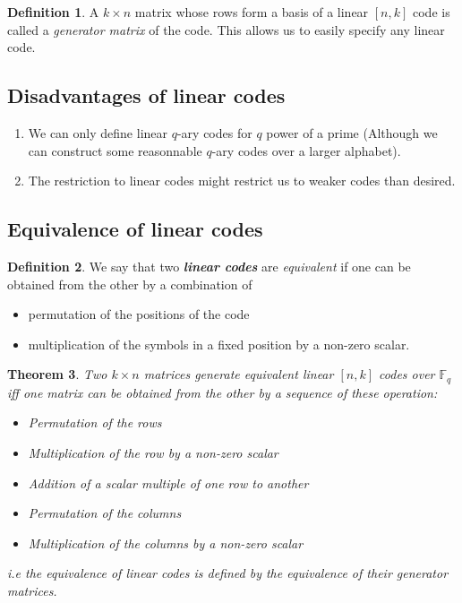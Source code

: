 \documentclass[11pt,a4paper]{article}
\theoremstyle{definition}
\newtheorem{definition}{Definition}[section]
\theoremstyle{plain}
\newtheorem{theorem}[definition]{Theorem}
\theoremstyle{remark}
\begin{document}
\begin{definition}
    A $k \times n$ matrix whose rows form a basis of a linear $[n,k]$ code is called a \emph{generator matrix} of the code.
    This allows us to easily specify any linear code. 
\end{definition}

\subsection{Disadvantages of linear codes}

\begin{enumerate}[label = \roman*)]
    \item We can only define linear $q$-ary codes for $q$ power of a prime (Although we can construct some reasonnable $q$-ary codes over a larger alphabet). 
    \item The restriction to linear codes might restrict us to weaker codes than desired. 
\end{enumerate}

\subsection{Equivalence of linear codes}

\begin{definition}
    We say that two \textbf{\emph{linear codes}} are \emph{equivalent} if one can be obtained from the other by a combination of 
    \begin{itemize}
        \item permutation of the positions of the code 
        \item multiplication of the symbols in a fixed position by a non-zero scalar. 
    \end{itemize}
\end{definition}

\begin{theorem}
    Two $k \times n$ matrices generate equivalent linear $[n,k]$ codes over $\mathbb{F}_q$ iff one matrix 
    can be obtained from the other by a sequence of these operation: 
    \begin{itemize}
        \item[R1. ] Permutation of the rows 
        \item[R2. ] Multiplication of the row by a non-zero scalar 
        \item[R3. ] Addition of a scalar multiple of one row to another 
        \item[C1. ] Permutation of the columns 
        \item[C2. ] Multiplication of the columns by a non-zero scalar    
    \end{itemize}
    i.e the equivalence of linear codes is defined by the equivalence of their generator matrices.
\end{theorem}
\end{document}
